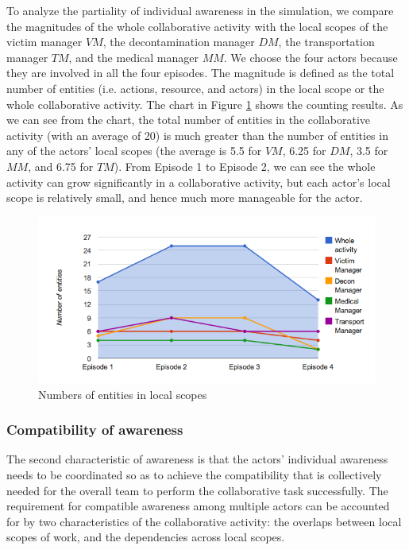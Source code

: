 To analyze the partiality of individual awareness in the simulation, we compare the magnitudes of the whole collaborative activity with the local scopes of the victim manager $VM$, the decontamination manager $DM$, the transportation manager $TM$, and the medical manager $MM$. We choose the four actors because they are involved in all the four episodes. The magnitude is defined as the total number of entities (i.e. actions, resource, and actors) in the local scope or the whole collaborative activity. The chart in Figure \ref{fig:partiality_of_awareness_case} shows the counting results. As we can see from the chart, the total number of entities in the collaborative activity (with an average of 20) is much greater than the number of entities in any of the actors' local scopes (the average is 5.5 for $VM$, 6.25 for $DM$, 3.5 for $MM$, and 6.75 for $TM$). From Episode 1 to Episode 2, we can see the whole activity can grow significantly in a collaborative activity, but each actor's local scope is relatively small, and hence much more manageable for the actor.

\begin{figure}[htbp] %
	\centering
	\includegraphics[width=5.8in]{partiality_of_awareness_case.jpg} 
	\caption{Numbers of entities in local scopes}
	\label{fig:partiality_of_awareness_case}
\end{figure}

\subsubsection{Compatibility of awareness} %
\label{ssub:compatibility_of_awareness}
The second characteristic of awareness is that the actors' individual awareness needs to be coordinated so as to achieve the compatibility that is collectively needed for the overall team to perform the collaborative task successfully. The requirement for compatible awareness among multiple actors can be accounted for by two characteristics of the collaborative activity: the overlaps between local scopes of work, and the dependencies across local scopes.

